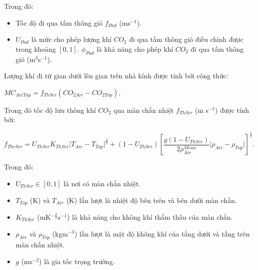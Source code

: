 \documentclass[a4paper]{article}
\begin{document}
	    Trong đó:
	    \begin{itemize}
	        \item Tốc độ đi qua tấm thông gió $f_{Pad}$ (ms$^{-1}$).
	        \item $U_{Pad}$ là mức cho phép lượng khí $CO_2$ đi qua tấm thông gió điều chỉnh được trong khoảng $[0,1]$.
	         $\phi_{Pad}$ là khả năng cho phép khí $CO_2$ đi qua tấm thông gió (m$^3$s$^{-1}$). 
	    \end{itemize}
	    \vspace{5mm}
	    Lượng khí đi từ gian dưới lên gian trên nhà kính được tính bởi công thức:
	    \begin{center}
	        $MC_{AirTop} = f_{ThScr}(CO_{2Air} - CO_{2Top}),$
	    \end{center}
	    Trong đó tốc độ lưu thông khí $CO_2$ qua màn chắn nhiệt $f_{ThScr}$ (m s$^{-1}$) được tính bởi:
	    \begin{center}
	        $f_{ThrScr} = U_{ThScr}K_{ThScr}\vert T_{Air}-T_{Top}\vert^{\frac{2}{3}} + (1 - U_{ThScr})\left[\dfrac{g(1-U_{ThScr})}{2\rho^{Mean}_{Air}}\vert \rho_{Air} - \rho_{Top} \vert \right]^{\frac{1}{2}}.$
	    \end{center}
	    Trong đó:
	    \begin{itemize}
	        \item $U_{ThScr} \in [0,1]$ là nơi có màn chắn nhiệt.
	        \item $T_{Top}$ (K) và $T_{Air}$ (K) lần lượt là nhiệt độ bên trên và bên dưới màn chắn.
	        \item $K_{ThScr}$ (mK$^{-\frac{2}{3}}$s$^{-1}$) là khả năng cho không khí thẩm thấu của màn chắn.
	        \item $\rho_{Air}$ và $\rho_{Top}$ (kgm$^{-3}$) lần lượt là mật độ không khí của tằng dưới và tầng trên màn chắn nhiệt.
	        \item $g$ (ms$^{-2}$) là gia tốc trọng trường.
	    \end{itemize}
	    \vspace{5mm}
	    
\end{document}
